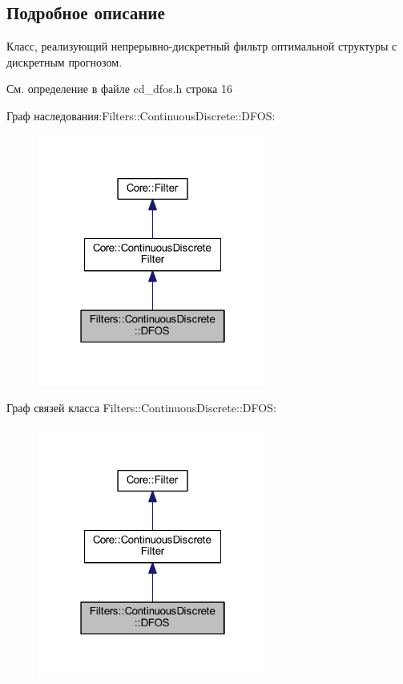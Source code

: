 \subsection{Подробное описание}
Класс, реализующий непрерывно-\/дискретный фильтр оптимальной структуры с дискретным прогнозом. 

См. определение в файле cd\+\_\+dfos.\+h строка 16



Граф наследования\+:Filters\+:\+:Continuous\+Discrete\+:\+:D\+F\+OS\+:\nopagebreak
\begin{figure}[H]
\begin{center}
\leavevmode
\includegraphics[width=214pt]{class_filters_1_1_continuous_discrete_1_1_d_f_o_s__inherit__graph}
\end{center}
\end{figure}


Граф связей класса Filters\+:\+:Continuous\+Discrete\+:\+:D\+F\+OS\+:\nopagebreak
\begin{figure}[H]
\begin{center}
\leavevmode
\includegraphics[width=214pt]{class_filters_1_1_continuous_discrete_1_1_d_f_o_s__coll__graph}
\end{center}
\end{figure}



